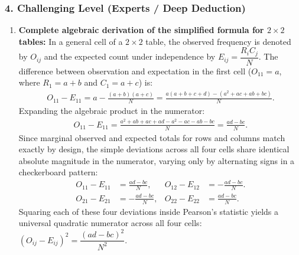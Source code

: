 \subsubsection*{4. Challenging Level (Experts / Deep Deduction)}

\begin{solproblema}
	\begin{enumerate}
		\item \textbf{Complete algebraic derivation of the simplified formula for $2 \times 2$ tables:}
		In a general cell of a $2 \times 2$ table, the observed frequency is denoted by $O_{ij}$ and the expected count under independence by $E_{ij} = \dfrac{R_i C_j}{N}$. The difference between observation and expectation in the first cell ($O_{11} = a$, where $R_1 = a+b$ and $C_1 = a+c$) is:
		\begin{align}
			O_{11} - E_{11} = a - \frac{(a+b)(a+c)}{N} = \frac{a(a+b+c+d) - (a^2 + ac + ab + bc)}{N}.
		\end{align}
		Expanding the algebraic product in the numerator:
		\begin{align}
			O_{11} - E_{11} = \frac{a^2 + ab + ac + ad - a^2 - ac - ab - bc}{N} = \frac{ad - bc}{N}.
		\end{align}
		Since marginal observed and expected totals for rows and columns match exactly by design, the simple deviations across all four cells share identical absolute magnitude in the numerator, varying only by alternating signs in a checkerboard pattern:
		\begin{align}
			O_{11} - E_{11} &= \frac{ad - bc}{N}, & O_{12} - E_{12} &= -\frac{ad - bc}{N}. \\
			O_{21} - E_{21} &= -\frac{ad - bc}{N}, & O_{22} - E_{22} &= \frac{ad - bc}{N}.
		\end{align}
		Squaring each of these four deviations inside Pearson's statistic yields a universal quadratic numerator across all four cells: $(O_{ij} - E_{ij})^2 = \dfrac{(ad - bc)^2}{N^2}$.
		

\end{enumerate}
\end{solproblema}
